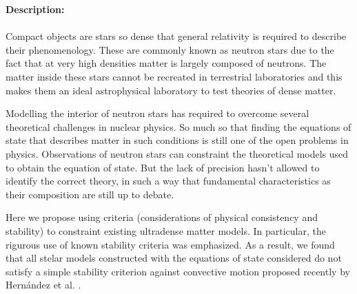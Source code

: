 \begin{abstract1}
    \begin{spacing}{1.0}
    \noindent \textbf{Description:}\\ \\
    \noindent Compact objects are stars so dense that general relativity is required to describe their phenomenology. These are commonly known as neutron stars due to the fact that at very high densities matter is largely composed of neutrons. The matter inside these stars cannot be recreated in terrestrial laboratories and this makes them an ideal astrophysical laboratory to test theories of dense matter.
    
    Modelling the interior of neutron stars has required to overcome several theoretical challenges in nuclear physics. So much so that finding the equations of state that describes matter in such conditions is still one of the open problems in physics. Observations of neutron stars can constraint the theoretical models used to obtain the equation of state. But the lack of precision hasn't allowed to identify the correct theory, in such a way that fundamental characteristics as their composition are still up to debate.
    
    Here we propose using  criteria (considerations of physical consistency and stability) to constraint existing ultradense matter models. In particular, the rigurous use of known stability criteria was emphasized. As a result, we found that all stelar models constructed with the equations of state considered do not satisfy a simple stability criterion against convective motion proposed recently by Hernández et al. \cite{Hernandez2018}.
    \end{spacing}
\end{abstract1}